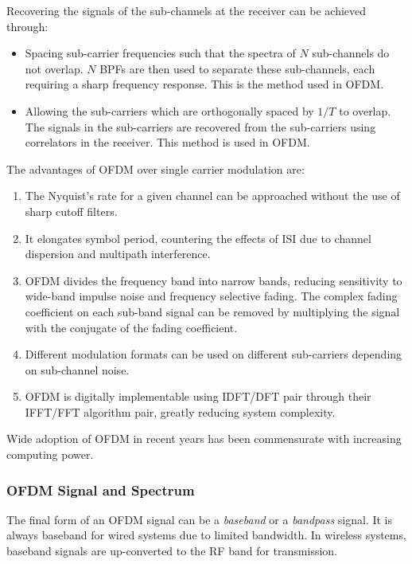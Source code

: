 Recovering the signals of the sub-channels at the receiver can be achieved through:
\begin{itemize}
	\item Spacing sub-carrier frequencies such that the spectra of \(N\) sub-channels do not overlap. \(N\) \gls{BPF}s are then used to separate these sub-channels, each requiring a sharp frequency response. This is the method used in \gls{OFDM}.
	\item Allowing the sub-carriers which are orthogonally spaced by \(1/T\) to overlap. The signals in the sub-carriers are recovered from the sub-carriers using correlators in the receiver. This method is used in \gls{OFDM}.
\end{itemize}
The advantages of \gls{OFDM} over single carrier modulation are:
\begin{enumerate}
	\item The Nyquist's rate for a given channel can be approached without the use of sharp cutoff filters.
	\item It elongates symbol period, countering the effects of \gls{ISI} due to channel dispersion and multipath interference.
	\item OFDM divides the frequency band into narrow bands, reducing sensitivity to wide-band impulse noise and frequency selective fading. The complex fading coefficient on each sub-band signal can be removed by multiplying the signal with the conjugate of the fading coefficient.
	\item Different modulation formats can be used on different sub-carriers depending on sub-channel noise.
	\item OFDM is digitally implementable using \gls{IDFT}/\gls{DFT} pair through their \gls{IFFT}/\gls{FFT} algorithm pair, greatly reducing system complexity.
\end{enumerate}
Wide adoption of OFDM in recent years has been commensurate with increasing computing power.

\subsubsection{OFDM Signal and Spectrum}
The final form of an OFDM signal can be a \emph{baseband} or a \emph{bandpass} signal. It is always baseband for wired systems due to limited bandwidth. In wireless systems, baseband signals are up-converted to the \gls{RF} band for transmission.
